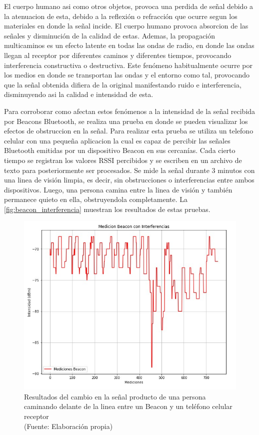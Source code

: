 El cuerpo humano asi como otros objetos, provoca una perdida de señal debido a la atenuacion de esta, debido a la reflexión o refracción que ocurre segun los materiales en donde la señal incide. El cuerpo humano provoca absorcion de las señales y disminución de la calidad de estas. Ademas, la propagación multicaminos es un efecto latente en todas las ondas de radio, en donde las ondas llegan al receptor por diferentes caminos y diferentes tiempos, provocando interferencia constructiva o destructiva. Este fenómeno habitualmente ocurre por los medios en donde se transportan las ondas y el entorno como tal, provocando que la señal obtenida difiera de la original manifestando ruido e interferencia, disminuyendo asi la calidad e intensidad de esta.

Para corroborar como afectan estos fenómenos a la intensidad de la señal recibida por Beacons Bluetooth, se realiza una prueba en donde se pueden visualizar los efectos de obstruccion en la señal. Para realizar esta prueba se utiliza un telefono celular con una pequeña aplicacion la cual es capaz de percibir las señales Bluetooth emitidas por un dispositivo Beacon en sus cercanías. Cada cierto tiempo se registran los valores RSSI percibidos y se escriben en un archivo de texto para posteriormente ser procesados. Se mide la señal durante 3 minutos con una linea de visión limpia, es decir, sin obstrucciones o interferencias entre ambos dispositivos. Luego, una persona camina entre la linea de visión y también permanece quieto en ella, obstruyendola completamente. La \autoref{fig:beacon_interferencia} muestran los resultados de estas pruebas.

\begin{figure}[ht!]
\centering
\includegraphics[width=.6\textwidth]{figures/mediciones_beacon_interferencia.jpg}
\caption[abs]{Resultados del cambio en la señal producto de una persona caminando delante de la linea entre un Beacon y un teléfono celular receptor\\
{\scriptsize (Fuente: Elaboración propia)}}
\label{fig:beacon_interferencia}
\end{figure}

